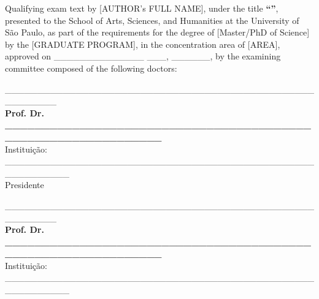 \begin{folhadeaprovacao}

\noindent Qualifying exam text by [AUTHOR's FULL NAME], under the title \textbf{``\imprimirtitulo''}, presented to the School of Arts, Sciences, and Humanities at the University of São Paulo, as part of the requirements for the degree of [Master/PhD of Science] by the [GRADUATE PROGRAM], in the concentration area of [AREA], approved on \_\_\_\_\_\_\_\_\_\_\_\_\_\_ \_\_\_, \_\_\_\_\_\_, by the examining committee composed of the following doctors:


\vspace*{3cm}

\begin{center}

\_\_\_\_\_\_\_\_\_\_\_\_\_\_\_\_\_\_\_\_\_\_\_\_\_\_\_\_\_\_\_\_\_\_\_\_\_\_\_\_\_\_\_\_\_\_\_\_\_\_\_\_\_\_\_\_
\vspace*{0.2cm}
\\ \textbf{Prof. Dr. \_\_\_\_\_\_\_\_\_\_\_\_\_\_\_\_\_\_\_\_\_\_\_\_\_\_\_\_\_\_\_\_\_\_\_\_\_\_\_\_\_\_\_\_\_\_\_\_\_\_\_\_\_\_\_\_\_\_\_\_\_\_}
\\ \vspace*{0.2cm}
Instituição: \_\_\_\_\_\_\_\_\_\_\_\_\_\_\_\_\_\_\_\_\_\_\_\_\_\_\_\_\_\_\_\_\_\_\_\_\_\_\_\_\_\_\_\_\_\_\_\_\_\_\_\_\_\_\_\_\_\_
\\ \vspace*{0.2cm}
Presidente

\vspace*{2cm}

\_\_\_\_\_\_\_\_\_\_\_\_\_\_\_\_\_\_\_\_\_\_\_\_\_\_\_\_\_\_\_\_\_\_\_\_\_\_\_\_\_\_\_\_\_\_\_\_\_\_\_\_\_\_\_\_
\vspace*{0.2cm}
\\ \textbf{Prof. Dr. \_\_\_\_\_\_\_\_\_\_\_\_\_\_\_\_\_\_\_\_\_\_\_\_\_\_\_\_\_\_\_\_\_\_\_\_\_\_\_\_\_\_\_\_\_\_\_\_\_\_\_\_\_\_\_\_\_\_\_\_\_\_}
\\ \vspace*{0.2cm}
Instituição: \_\_\_\_\_\_\_\_\_\_\_\_\_\_\_\_\_\_\_\_\_\_\_\_\_\_\_\_\_\_\_\_\_\_\_\_\_\_\_\_\_\_\_\_\_\_\_\_\_\_\_\_\_\_\_\_\_\_


\end{center}
\end{folhadeaprovacao}
